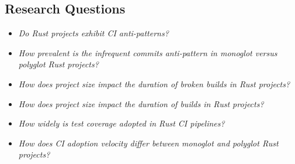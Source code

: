 \documentclass[11pt]{article}
\begin{document}
\subsection{Research Questions}
\begin{itemize}

\item \emph{Do Rust projects exhibit CI anti-patterns?}

\item \emph{How prevalent is the infrequent commits anti-pattern in monoglot versus polyglot Rust projects?}

\item \emph{How does project size impact the duration of broken builds in Rust projects?}

\item \emph{How does project size impact the duration of builds in Rust projects?}

\item \emph{How widely is test coverage adopted in Rust CI pipelines?}

\item \emph{How does CI adoption velocity differ between monoglot and polyglot Rust projects?}
\end{itemize}
\end{document}
